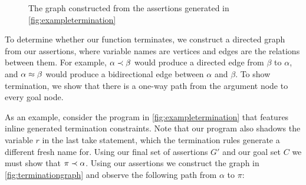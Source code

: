 \begin{figure}
    \centering
    
    \caption{The graph constructed from the assertions generated in \autoref{fig:exampletermination}}
    \label{fig:terminationgraph}
\end{figure}

\FloatBarrier

To determine whether our function terminates, we construct a directed graph from
our assertions, where variable names are vertices and edges are the relations
between them. For example, $\alpha \prec \beta$ would produce a directed edge from
$\beta$ to $\alpha$, and $\alpha \approx \beta$ would produce a bidirectional edge between 
$\alpha$ and $\beta$. To show termination, we show that there is a one-way path
from the argument node to every goal node.

As an example, consider the program in \autoref{fig:exampletermination} that
features inline generated termination constraints. Note that our program also shadows
the variable $r$ in the last \textsf{take} statement, which the termination
rules generate a different fresh name for. Using our final set of assertions
$G'$ and our goal set $C$ we must show that $\pi \prec \alpha$.
Using our assertions we construct the graph in \autoref{fig:terminationgraph}
and observe the following path from $\alpha$ to $\pi$:

